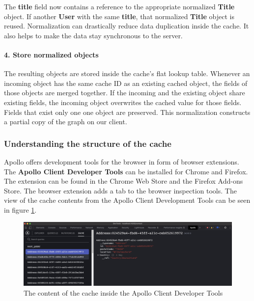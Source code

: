\noindent The \textbf{title} field now contains a reference to the appropriate normalized \textbf{Title} object. If another \textbf{User} with the same \textbf{title}, that normalized \textbf{Title} object is reused. Normalization can drastically reduce data duplication inside the cache. It also helps to make the data stay synchronous to the server.

\paragraph{4. Store normalized objects}

The resulting objects are stored inside the cache's flat lookup table. Whenever an incoming object has the same cache ID as an existing cached object, the fields of those objects are merged together. If the incoming and the existing object share existing fields, the incoming object overwrites the cached value for those fields. Fields that exist only one one object are preserved. This normalization constructs a partial copy of the graph on our client. \cite{misc:-:background:graphql:apollo-client-cache-overview}

\subsubsection{Understanding the structure of the cache}

Apollo offers development tools for the browser in form of browser extensions. The \textbf{Apollo Client Developer Tools} can be installed for Chrome and Firefox. The extension can be found in the Chrome Web Store and the Firefox Add-ons Store. The browser extension adds a tab to the browser inspection tools. \cite{misc:-:background:graphql:apollo-developer-tools} The view of the cache contents from the Apollo Client Development Tools can be seen in figure \ref{fig:background:graphql:apollo:apollo-dev-tools}.

\ifshowImages
\begin{figure}[H]
    \centering
    \includegraphics[width=1\linewidth]{images/background/apollo/apollo-dev-tools.jpeg}
    \caption{The content of the cache inside the Apollo Client Developer Tools}\label{fig:background:graphql:apollo:apollo-dev-tools}
\end{figure}
\fi

